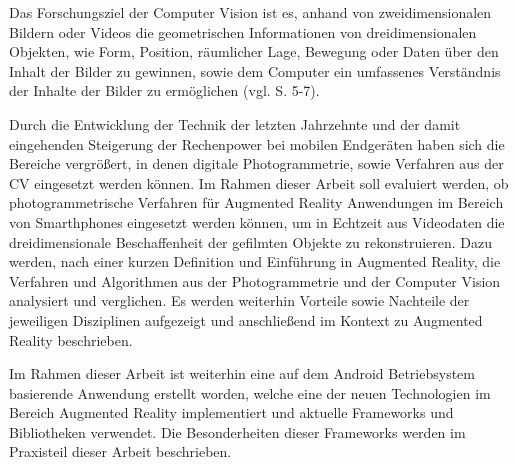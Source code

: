 Das Forschungsziel der Computer Vision ist es, anhand von zweidimensionalen Bildern oder Videos die geometrischen Informationen von dreidimensionalen Objekten, wie Form, Position, räumlicher Lage, Bewegung oder Daten über den Inhalt der Bilder zu gewinnen, sowie dem Computer ein umfassenes \glqq Verständnis\grqq{} der Inhalte der Bilder zu ermöglichen (vgl. \cite{photo} S. 5-7).

Durch die Entwicklung der Technik der letzten Jahrzehnte und der damit eingehenden Steigerung der Rechenpower bei mobilen Endgeräten haben sich die Bereiche vergrößert, in denen digitale Photogrammetrie, sowie Verfahren aus der CV eingesetzt werden können. Im Rahmen dieser Arbeit soll evaluiert werden, ob photogrammetrische Verfahren für Augmented Reality Anwendungen im Bereich von Smarthphones eingesetzt werden können, um in Echtzeit aus Videodaten die dreidimensionale Beschaffenheit der gefilmten Objekte zu rekonstruieren. Dazu werden, nach einer kurzen Definition und Einführung in Augmented Reality, die Verfahren und Algorithmen aus der Photogrammetrie und der Computer Vision analysiert und verglichen. Es werden weiterhin Vorteile sowie Nachteile der jeweiligen Disziplinen aufgezeigt und anschließend im Kontext zu Augmented Reality beschrieben. 

Im Rahmen dieser Arbeit ist weiterhin eine auf dem Android Betriebsystem basierende Anwendung erstellt worden, welche eine der neuen Technologien im Bereich Augmented Reality implementiert und aktuelle Frameworks und Bibliotheken verwendet. Die Besonderheiten dieser Frameworks werden im Praxisteil dieser Arbeit beschrieben.



  


